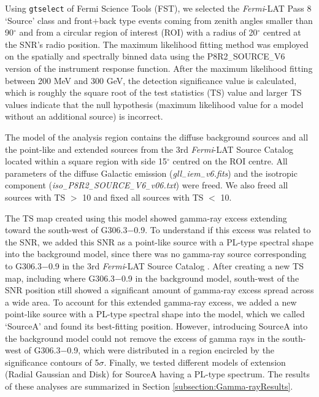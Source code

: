 \documentclass[useAMS,usenatbib]{mn2e}
\begin{document}
Using \texttt{gtselect} of Fermi Science Tools (FST), we selected the {\it Fermi}-LAT Pass 8 `Source' class and front$+$back type events coming from zenith angles smaller than 90$^{\circ}$ and from a circular region of interest (ROI) with a radius of 20$^{\circ}$ centred at the SNR's radio position. The maximum likelihood fitting method \citep{Ma96} was employed on the spatially and spectrally binned data using the P8R2$_{-}$SOURCE$_{-}\!\!$V6 version of the instrument response function. After the maximum likelihood fitting between 200 MeV and 300 GeV, the detection significance value is calculated, which is roughly the square root of the test statistics (TS) value and larger TS values indicate that the null hypothesis (maximum likelihood value for a model without an additional source) is incorrect.

The model of the analysis region contains the diffuse background sources and all the point-like and extended sources from the 3rd {\it Fermi}-LAT Source Catalog \citep{Ac15} located within a square region with side 15$^{\circ}$ centred on the ROI centre. All parameters of the diffuse Galactic emission (\emph{gll$_{-}$iem$_{-}$v6.fits}) and the isotropic component (\emph{iso$_{-}$P8R2$_{-}$SOURCE$_{-}\!\!$V6$_{-}\!$v06.txt}) were freed. We also freed all sources with TS $>$ 10 and fixed all sources with TS $<$ 10.

The TS map created using this model showed gamma-ray excess extending toward the south-west of G306.3$-$0.9. To understand if this excess was related to the SNR, we added this SNR as a point-like source with a PL-type spectral shape into the background model, since there was no gamma-ray source corresponding to G306.3$-$0.9 in the 3rd {\it Fermi}-LAT Source Catalog \citep{Ac15}. After creating a new TS map, including where G306.3$-$0.9 in the background model, south-west of the SNR position still showed a significant amount of gamma-ray excess spread across a wide area. To account for this extended gamma-ray excess, we added a new point-like source with a PL-type spectral shape into the model, which we called `SourceA' and found its best-fitting position. However, introducing SourceA into the background model could not remove the excess of gamma rays in the  south-west of G306.3$-$0.9, which were distributed in a region encircled by the significance contours of 5$\sigma$. Finally, we tested different models of extension (Radial Gaussian and Disk) for SourceA having a PL-type spectrum. The results of these analyses are summarized in Section \ref{subsection:Gamma-rayResults}. 
\end{document}
